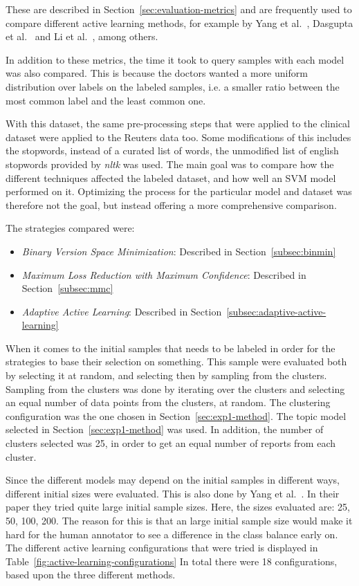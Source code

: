These are described in Section~\ref{sec:evaluation-metrics} and are frequently used to compare different active learning methods, for example by Yang et al\@.~\cite{yang2009effective}, Dasgupta et al\@.~\cite{dasgupta2008hierarchical} and Li et al\@.~\cite{li2013active}, among others.

In addition to these metrics, the time it took to query samples with each model was also compared.
This is because the doctors wanted a more uniform distribution over labels on the labeled samples, i.e. a smaller ratio between the most common label and the least common one.

With this dataset, the same pre-processing steps that were applied to the clinical dataset were applied to the Reuters data too.
Some modifications of this includes the stopwords, instead of a curated list of words, the unmodified list of english stopwords provided by \textit{nltk} was used.
The main goal was to compare how the different techniques affected the labeled dataset, and how well an SVM model performed on it.
Optimizing the process for the particular model and dataset was therefore not the goal, but instead offering a more comprehensive comparison.

The strategies compared were: 
\begin{itemize}
    \item \textit{Binary Version Space Minimization}: Described in Section~\ref{subsec:binmin}
    \item \textit{Maximum Loss Reduction with Maximum Confidence}: Described in Section~\ref{subsec:mmc}
    \item \textit{Adaptive Active Learning}: Described in Section~\ref{subsec:adaptive-active-learning}
\end{itemize}

When it comes to the initial samples that needs to be labeled in order for the strategies to base their selection on something.
This sample were evaluated both by selecting it at random, and selecting then by sampling from the clusters.
Sampling from the clusters was done by iterating over the clusters and selecting an equal number of data points from the clusters, at random.
The clustering configuration was the one chosen in Section~\ref{sec:exp1-method}.
The topic model selected in Section~\ref{sec:exp1-method} was used.
In addition, the number of clusters selected was 25, in order to get an equal number of reports from each cluster.

Since the different models may depend on the initial samples in different ways, different initial sizes were evaluated.
This is also done by Yang et al\@.~\cite{yang2009effective}.
In their paper they tried quite large initial sample sizes.
Here, the sizes evaluated are: 25, 50, 100, 200.
The reason for this is that an large initial sample size would make it hard for the human annotator to see a difference in the class balance early on.
The different active learning configurations that were tried is displayed in Table~\ref{fig:active-learning-configurations}
In total there were 18 configurations, based upon the three different methods.

